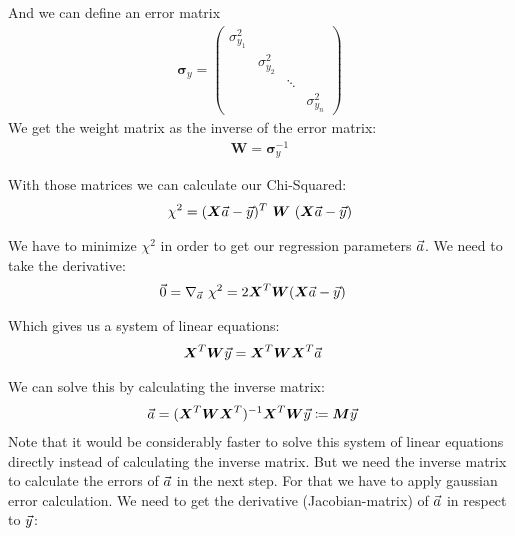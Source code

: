 \documentclass[11pt]{article}
\begin{document}
    And we can define an error matrix
    \newcommand{\eMatrix}{\boldsymbol{\sigma}_{y}}
    \newcommand{\eMatrixInv}{\boldsymbol{W}}
    \begin{align*}
        \eMatrix = \begin{pmatrix}
                       \sigma_{y_1}^2 \\
                       & \sigma_{y_2}^2\\
                       & & \ddots\\
                       & & & \sigma_{y_n}^2
        \end{pmatrix}
    \end{align*}
    We get the weight matrix as the inverse of the error matrix:
    \begin{align*}
        \eMatrixInv = \eMatrix^{-1}
    \end{align*}
    
    With those matrices we can calculate our Chi-Squared:
    \begin{align*}
        \chi^2 = (\xMatrix \aVec - \yVec)^T \ \eMatrixInv \ (\xMatrix \aVec - \yVec)
    \end{align*}
    
    We have to minimize $\chi^2$ in order to get our regression parameters $\vec{a}$.
    We need to take the derivative:
    \begin{align*}
        \vec{0} &= \nabla_{\aVec} \ \chi^2 = 2 \xMatrixT \eMatrixInv (\xMatrix \aVec - \yVec)
    \end{align*}
    
    Which gives us a system of linear equations:
    \begin{align*}
        \xMatrixT \eMatrixInv \yVec &= \xMatrixT \eMatrixInv \xMatrixT \aVec
    \end{align*}
    
    We can solve this by calculating the inverse matrix:
    \newcommand{\mMatrix}{\boldsymbol{M}}
    \begin{align*}
        \aVec &= (\xMatrixT \eMatrixInv \xMatrixT)^{-1} \xMatrixT \eMatrixInv \yVec \coloneqq \mMatrix \yVec
    \end{align*}
    Note that it would be considerably faster to solve this system of linear equations directly instead of calculating
    the inverse matrix.
    But we need the inverse matrix to calculate the errors of $\vec{a}$ in the next step.
    For that we have to apply gaussian error calculation.
    We need to get the derivative (Jacobian-matrix) of $\vec{a}$ in respect to $\vec{y}$:
    
\end{document}
